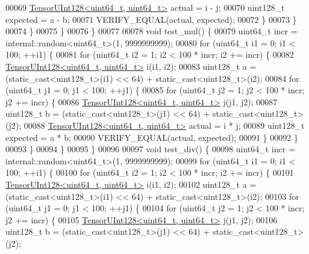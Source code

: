 \begin{DoxyCode}
00069           \hyperlink{struct_eigen_1_1internal_1_1_tensor_u_int128}{TensorUInt128<uint64\_t, uint64\_t>} actual = i - j;
00070           uint128\_t expected = a - b;
00071           VERIFY\_EQUAL(actual, expected);
00072         \}
00073       \}
00074     \}
00075   \}
00076 \}
00077 
00078 \textcolor{keywordtype}{void} test\_mul() \{
00079   uint64\_t incr = internal::random<uint64\_t>(1, 9999999999);
00080   \textcolor{keywordflow}{for} (uint64\_t i1 = 0; i1 < 100; ++i1) \{
00081     \textcolor{keywordflow}{for} (uint64\_t i2 = 1; i2 < 100 * incr; i2 += incr) \{
00082       \hyperlink{struct_eigen_1_1internal_1_1_tensor_u_int128}{TensorUInt128<uint64\_t, uint64\_t>} i(i1, i2);
00083       uint128\_t a = (\textcolor{keyword}{static\_cast<}uint128\_t\textcolor{keyword}{>}(i1) << 64) + \textcolor{keyword}{static\_cast<}uint128\_t\textcolor{keyword}{>}(i2);
00084       \textcolor{keywordflow}{for} (uint64\_t j1 = 0; j1 < 100; ++j1) \{
00085         \textcolor{keywordflow}{for} (uint64\_t j2 = 1; j2 < 100 * incr; j2 += incr) \{
00086           \hyperlink{struct_eigen_1_1internal_1_1_tensor_u_int128}{TensorUInt128<uint64\_t, uint64\_t>} j(j1, j2);
00087           uint128\_t b = (\textcolor{keyword}{static\_cast<}uint128\_t\textcolor{keyword}{>}(j1) << 64) + \textcolor{keyword}{static\_cast<}uint128\_t\textcolor{keyword}{>}(j2);
00088           \hyperlink{struct_eigen_1_1internal_1_1_tensor_u_int128}{TensorUInt128<uint64\_t, uint64\_t>} actual = i * j;
00089           uint128\_t expected = a * b;
00090           VERIFY\_EQUAL(actual, expected);
00091         \}
00092       \}
00093     \}
00094   \}
00095 \}
00096 
00097 \textcolor{keywordtype}{void} test\_div() \{
00098   uint64\_t incr = internal::random<uint64\_t>(1, 9999999999);
00099   \textcolor{keywordflow}{for} (uint64\_t i1 = 0; i1 < 100; ++i1) \{
00100     \textcolor{keywordflow}{for} (uint64\_t i2 = 1; i2 < 100 * incr; i2 += incr) \{
00101       \hyperlink{struct_eigen_1_1internal_1_1_tensor_u_int128}{TensorUInt128<uint64\_t, uint64\_t>} i(i1, i2);
00102       uint128\_t a = (\textcolor{keyword}{static\_cast<}uint128\_t\textcolor{keyword}{>}(i1) << 64) + \textcolor{keyword}{static\_cast<}uint128\_t\textcolor{keyword}{>}(i2);
00103       \textcolor{keywordflow}{for} (uint64\_t j1 = 0; j1 < 100; ++j1) \{
00104         \textcolor{keywordflow}{for} (uint64\_t j2 = 1; j2 < 100 * incr; j2 += incr) \{
00105           \hyperlink{struct_eigen_1_1internal_1_1_tensor_u_int128}{TensorUInt128<uint64\_t, uint64\_t>} j(j1, j2);
00106           uint128\_t b = (\textcolor{keyword}{static\_cast<}uint128\_t\textcolor{keyword}{>}(j1) << 64) + \textcolor{keyword}{static\_cast<}uint128\_t\textcolor{keyword}{>}(j2);

\end{DoxyCode}
